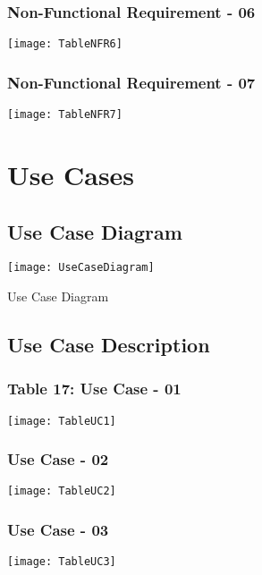 \begin{figure}[ht]
\subsubsection{Non-Functional Requirement - 06}
\centering
\texttt{[image: TableNFR6]}
\end{figure}

\begin{figure}[ht]
\subsubsection{Non-Functional Requirement - 07}
\centering
\texttt{[image: TableNFR7]}
\end{figure}
\begin{figure}
\section{Use Cases}
\subsection{Use Case Diagram}
\center
\texttt{[image: UseCaseDiagram]}
\caption{Use Case Diagram}
\label{fig:UseCaseDiagram}
\end{figure}

\begin{figure}[ht]
\subsection{Use Case Description}
\subsubsection{Table 17: Use Case - 01}
\centering
\texttt{[image: TableUC1]}
\end{figure}
\begin{figure}[ht]
\subsubsection{Use Case - 02}
\centering
\texttt{[image: TableUC2]}
\end{figure}

\begin{figure}[ht]
\subsubsection{Use Case - 03}
\centering
\texttt{[image: TableUC3]}
\end{figure}

